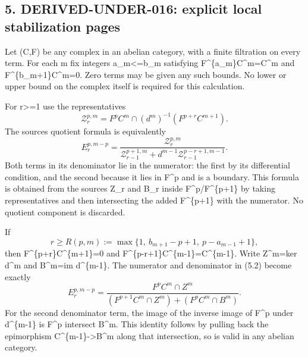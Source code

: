 \subsection{\texorpdfstring{5. DERIVED-UNDER-016:\allowbreak{} explicit local stabilization pages}{5.  explicit local stabilization pages}}\label{proofs-8352-8772-derived-under-016-explicit-local-stabilization-pages}

Let (C,\allowbreak{}F)\allowbreak{} be any complex in an abelian category,\allowbreak{} with a finite filtration on every term. For each m fix integers a\_\allowbreak{}m<\allowbreak{}=b\_\allowbreak{}m satisfying F\textasciicircum{}\{a\_\allowbreak{}m\}C\textasciicircum{}m\allowbreak{}=C\textasciicircum{}m and F\textasciicircum{}\{b\_\allowbreak{}m\allowbreak{}+1\}C\textasciicircum{}m\allowbreak{}=0. Zero terms may be given any such bounds. No lower or upper bound on the complex itself is required for this calculation.

For r>\allowbreak{}=1 use the representatives \[
 \mathcal Z_r^{p,m}
     =F^pC^m\cap(d^m)^{-1}(F^{p+r}C^{m+1}).
                                                               \tag{5.1}
\] The source\textquotesingle s quotient formula is equivalently \[
 E_r^{p,m-p}=
 \frac{\mathcal Z_r^{p,m}}
 {\mathcal Z_{r-1}^{p+1,m}
       +d^{m-1}\mathcal Z_{r-1}^{p-r+1,m-1}}.                 \tag{5.2}
\] Both terms in its denominator lie in the numerator:\allowbreak{} the first by its differential condition,\allowbreak{} and the second because it lies in F\^{}p and is a boundary. This formula is obtained from the source\textquotesingle s Z\_\allowbreak{}r and B\_\allowbreak{}r inside F\textasciicircum{}p/\allowbreak{}F\textasciicircum{}\{p\allowbreak{}+1\} by taking representatives and then intersecting the added F\textasciicircum{}\{p\allowbreak{}+1\} with the numerator. No quotient component is discarded.

If \[
 r\ge R(p,m):=
 \max\{1,\ b_{m+1}-p+1,\ p-a_{m-1}+1\},                    \tag{5.3}
\] then F\textasciicircum{}\{p\allowbreak{}+r\}C\textasciicircum{}\{m\allowbreak{}+1\}\allowbreak{}=0 and F\textasciicircum{}\{p-r\allowbreak{}+1\}C\textasciicircum{}\{m-1\}\allowbreak{}=C\textasciicircum{}\{m-1\}. Write Z\textasciicircum{}m\allowbreak{}=ker d\^{}m and B\textasciicircum{}m\allowbreak{}=im d\^{}\{m-1\}. The numerator and denominator in (5.2)\allowbreak{} become exactly \[
 E_r^{p,m-p}=
 \frac{F^pC^m\cap Z^m}
 {(F^{p+1}C^m\cap Z^m)+(F^pC^m\cap B^m)}.                  \tag{5.4}
\] For the second denominator term,\allowbreak{} the image of the inverse image of F\^{}p under d\^{}\{m-1\} is F\^{}p intersect B\^{}m. This identity follows by pulling back the epimorphism C\textasciicircum{}\{m-1\}\allowbreak{}->B\textasciicircum{}m along that intersection,\allowbreak{} so is valid in any abelian category.

